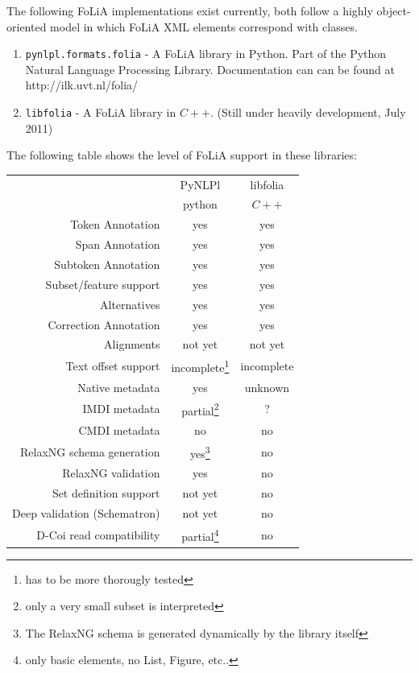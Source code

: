 \documentclass[a4paper,12pt]{report}
\begin{document}
The following FoLiA implementations exist currently, both follow a highly object-oriented model in which FoLiA XML elements correspond with classes.

\begin{enumerate}
\item \texttt{pynlpl.formats.folia} - A FoLiA library in Python. Part of the Python Natural Language Processing Library. Documentation can can be found at http://ilk.uvt.nl/folia/
\item \texttt{libfolia} - A FoLiA library in $C++$. (Still under heavily development, July 2011)
\end{enumerate}

The following table shows the level of FoLiA support in these libraries:

\begin{tabular}{|r|c|c|}
\hline
                        & PyNLPl & libfolia  \\
                        & python & $C++$ \\
\hline
Token Annotation        & yes & yes \\
Span Annotation         & yes & yes \\
Subtoken Annotation     & yes & yes \\
Subset/feature support  & yes & yes \\
Alternatives            & yes & yes \\
Correction Annotation   & yes & yes \\
Alignments              & not yet & not yet \\
Text offset support     & incomplete\footnote{has to be more thorougly tested} & incomplete \\
Native metadata         & yes & unknown \\
\hline
IMDI metadata           & partial\footnote{only a very small subset is interpreted} & ? \\
CMDI metadata           & no & no \\
RelaxNG schema generation & yes\footnote{The RelaxNG schema is generated dynamically by the library itself} & no \\
RelaxNG validation      & yes & no \\
Set definition support  & not yet & no \\
Deep validation (Schematron)  & not yet & no \\
D-Coi read compatibility      & partial\footnote{only basic elements, no List, Figure, etc..} & no \\
\hline
\end{tabular}

 
 




\end{document}

